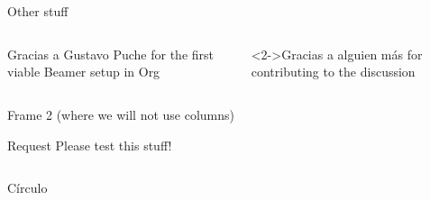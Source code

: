 \documentclass[aspectratio=169,presentation]{beamer}
\begin{document}
\section{}
\label{sec:org092f877}
\begin{frame}[label={sec:org5431052}]{}
\end{frame}
\begin{frame}[label={sec:org8c57edf}]{Other stuff}
\begin{columns}
\begin{column}{0.48\columnwidth}
\begin{block}{Gracias a Gustavo Puche}
for the first viable Beamer setup in Org
\end{block}
\end{column}
\begin{column}{0.48\columnwidth}
\begin{block}<2->{Gracias a alguien más}
for contributing to the discussion
\end{block}
\end{column}
\end{columns}
\end{frame}
\begin{frame}[label={sec:orgb907204}]{Frame 2 (where we will not use columns)}
\begin{block}{Request}
Please test this stuff!
\end{block}

\begin{columns}
\begin{column}{0.4\columnwidth}
\begin{block}{Círculo}
\end{block}
\end{column}
\end{columns}
\end{frame}
\end{document}
